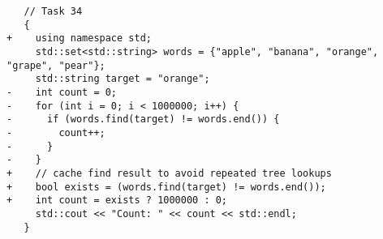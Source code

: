 \begin{verbatim}
   // Task 34
   {
+    using namespace std;
     std::set<std::string> words = {"apple", "banana", "orange", "grape", "pear"};
     std::string target = "orange";
-    int count = 0;
-    for (int i = 0; i < 1000000; i++) {
-      if (words.find(target) != words.end()) {
-        count++;
-      }
-    }
+    // cache find result to avoid repeated tree lookups
+    bool exists = (words.find(target) != words.end());
+    int count = exists ? 1000000 : 0;
     std::cout << "Count: " << count << std::endl;
   }

\end{verbatim}